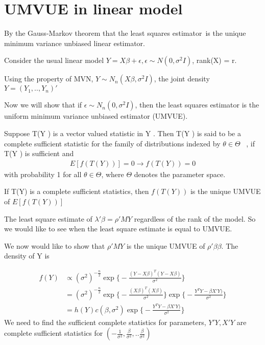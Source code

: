 
 \section{UMVUE in linear model}
  By the Gauss-Markov theorem that the least squares estimator is the unique minimum variance unbiased linear estimator. 
  
 Consider the usual linear model $Y = X\beta + \epsilon, \epsilon \sim N(0, \sigma^2 I)$, rank(X) = r.
 
 Using the property of MVN, $Y \sim N_n (X \beta, \sigma^2 I) $, the joint density $Y = (Y_1, .., Y_n)'$
 
 Now we will show that if $\epsilon \sim N_n(0, \sigma^2 I)$, then the least squares estimator is the uniform minimum variance unbiased estimator (UMVUE). 
 
\begin{definition}
Suppose T(Y ) is a vector valued statistic in Y . Then T(Y ) is said to be a complete sufficient statistic for the family of distributions indexed by $\theta \in \Theta$  , if T(Y ) is sufficient and 
\begin{align*}
E[f(T(Y))] = 0 \rightarrow f(T(Y)) = 0
\end{align*}
with probability 1 for all $\theta \in \Theta$, where $\Theta$ denotes the parameter space.
\end{definition}


\begin{theorem}
If T(Y) is a complete sufficient statistics, then $f(T(Y))$ is the unique UMVUE of $E[f(T(Y))] $
\end{theorem}

The least square estimate of $\lambda' \beta = \rho' MY$ regardless of the rank of the model. So we would like to see when the least square estimate is equal to UMVUE.

We now would like to show that $\rho' MY$ is the unique UMVUE of $\rho' \beta \beta $. 
The density of Y is 

\begin{align*}
f(Y)& \propto (\sigma^2)^{-\frac{n}{2}} \exp \Big \{ - \frac{(Y- X\beta)^T(Y- X\beta)}{\sigma^2} \Big \} \\
&= (\sigma^2)^{-\frac{n}{2}} \exp \Big \{ - \frac{(X\beta)^T(X\beta)}{\sigma^2} \Big \}  \exp \Big \{ - \frac{Y^TY- \beta X' Y)}{\sigma^2} \Big \} \\
&= h(Y) c(\beta, \sigma^2) \exp \Big \{ - \frac{Y^TY- \beta X' Y)}{\sigma^2} \Big \} 
\end{align*}
We need to find the sufficient complete statistics for parameters, $Y'Y, X'Y$ are complete sufficient statistics for $(-\frac{1}{\sigma^2}, \frac{\beta}{\sigma^2},.. \frac{\beta}{\sigma^2})$
 
